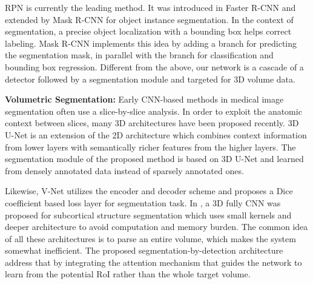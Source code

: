 RPN is currently the leading method. It was introduced in Faster R-CNN \cite{ren2015faster} and extended by Mask R-CNN \cite{he2017mask} for object instance segmentation. 
In the context of segmentation, a precise object localization with a bounding box helps correct labeling. Mask R-CNN implements this idea by adding a branch for predicting the segmentation mask, in parallel with the branch for classification and bounding box regression. Different from the above, 
our network is a cascade of a detector followed by a segmentation module and targeted for 3D volume data.
\vspace{1em}

\noindent\textbf{Volumetric Segmentation:} 
Early CNN-based methods in medical image segmentation often use a slice-by-slice analysis. In order to exploit the anatomic context between slices, many 3D architectures have been proposed recently. 3D U-Net \cite{cciccek20163d} is an extension of the 2D architecture \cite{ronneberger2015u} which combines context information from lower layers with semantically richer features from the higher layers. The segmentation module of the proposed method is based on 3D U-Net and learned from densely annotated data instead of sparsely annotated ones. 

Likewise, V-Net \cite{milletari2016v} utilizes the encoder and decoder scheme and proposes a Dice coefficient based loss layer for segmentation task. In \cite{dolz20173d}, a 3D fully CNN was proposed for subcortical structure segmentation which uses small kernels and deeper architecture to avoid computation and memory burden.
The common idea of all these architectures \cite{cciccek20163d,milletari2016v,dolz20173d} is to parse an entire volume, which makes the system somewhat inefficient. The proposed segmentation-by-detection architecture address that by integrating the attention mechanism that guides the network to learn from the potential RoI rather than the whole target volume.



 






